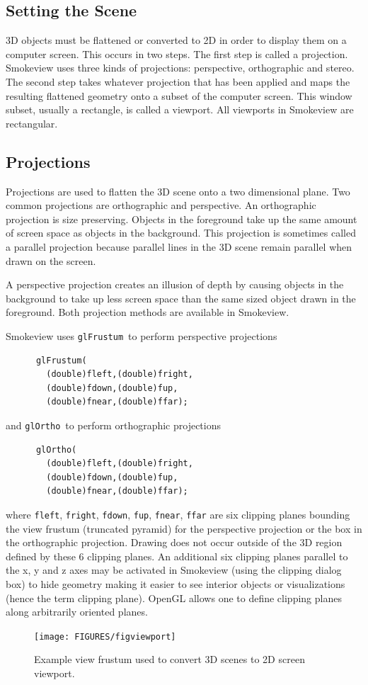 \documentclass[11pt,twoside]{book}
\begin{document}
\subsection{Setting the Scene}
3D objects must be flattened or converted to 2D in order to
display them on a computer screen.  This occurs in two steps.  The
first step is called a projection.  Smokeview uses three kinds of
projections: perspective, orthographic and stereo.  The second
step takes whatever projection that has been applied and maps the
resulting flattened geometry onto a subset of the computer screen.
This window subset, usually a rectangle, is called a viewport. All
viewports in Smokeview are rectangular.

\subsection{Projections}
Projections are used to flatten the 3D scene onto a two
dimensional plane. Two common projections are orthographic and
perspective. An orthographic projection is size preserving.
Objects in the foreground take up the same amount of screen space
as objects in the background. This projection is sometimes called
a parallel projection because parallel lines in the 3D scene
remain parallel when drawn on the screen.

A perspective projection creates an illusion of depth by causing
objects in the background to take up less screen space than the
same sized object drawn in the foreground.  Both projection
methods are available in Smokeview.

Smokeview uses {\tt glFrustum}\ to perform perspective projections
\begin{lstlisting}
      glFrustum(
        (double)fleft,(double)fright,
        (double)fdown,(double)fup,
        (double)fnear,(double)ffar);
\end{lstlisting}
and {\tt glOrtho}\ to perform orthographic projections
\begin{lstlisting}
      glOrtho(
        (double)fleft,(double)fright,
        (double)fdown,(double)fup,
        (double)fnear,(double)ffar);
\end{lstlisting}

\noindent where {\tt fleft}, {\tt fright}, {\tt fdown}, {\tt fup}, {\tt fnear},
{\tt ffar} are six clipping planes bounding the view frustum (truncated pyramid)
for the perspective projection or the box in the orthographic projection.
Drawing does not occur outside of the 3D region defined by these 6 clipping planes.
An additional six clipping planes parallel to the x, y and z axes may be activated
in Smokeview (using the clipping dialog box) to hide geometry making it easier to
see interior objects or visualizations (hence the term clipping plane).  OpenGL
allows one to define clipping planes along arbitrarily oriented planes.
\begin{figure}[\figoptions]
\begin{center}
\texttt{[image: FIGURES/figviewport]}
\end{center}
\caption{Example view frustum used to convert 3D scenes to 2D
screen viewport.}
 \label{figfrustum}
\end{figure}
\end{document}
